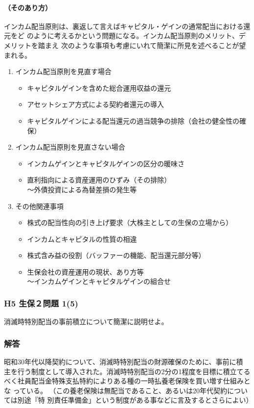 \documentclass[report,gutter=10mm,fore-edge=10mm,uplatex,dvipdfmx]{jlreq}
\begin{document}
\paragraph{（そのあり方）}
インカム配当原則は、裏返して言えばキャピタル・ゲインの通常配当における還元をど
のように考えるかという問題になる。インカム配当原則のメリット、デメリットを踏まえ
次のような事項も考慮にいれて簡潔に所見を述べることが望まれる。
\begin{enumerate} [◯]
\item インカム配当原則を見直す場合
\begin{itemize}
 \item キャピタルゲインを含めた総合運用収益の還元
\item アセットシェア方式による契約者還元の導入
\item キャピタルゲインによる配当還元の過当競争の排除（会社の健全性の確保）
\end{itemize}
\item インカム配当原則を見直さない場合
\begin{itemize}
 \item インカムゲインとキャピタルゲインの区分の暖味さ
 \item 直利指向による資産運用のひずみ（その排除）\\
 〜外債投資による為替差損の発生等
\end{itemize}
\item その他関連事項
\begin{itemize}
 \item 株式の配当性向の引き上げ要求（大株主としての生保の立場から）
 \item インカムとキャピタルの性質の相違
 \item 株式含み益の役割（バッファーの機能、配当還元部分等）
 \item 生保会社の資産運用の現状、あり方等\\
 〜インカムゲインとキャピタルゲインの組合せ
\end{itemize}
\end{enumerate}

\subsubsection{H5 生保２問題 1(5)}
消滅時特別配当の事前積立について簡潔に説明せよ。
\subsubsection{解答}

昭和30年代以降契約について、消滅時特別配当の財源確保のために、事前に積
主を行う制度として導入された。消滅時特別配当の2分の1程度を目標に積立てる
べく社員配当金特殊支払特約によりある種の一時払養老保険を買い増す仕組みとな
っている。
（この養老保険は無配当であること、あるいは20年代契約については別途『特
別責任準備金」という制度がある事などに言及するとさらによい）
\end{document}
